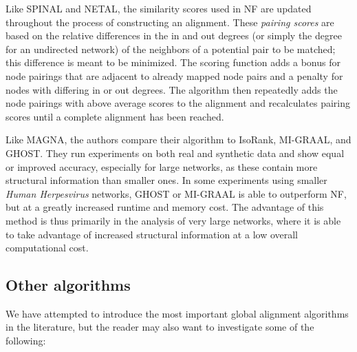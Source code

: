 \documentclass[12pt]{thesis}
\theoremstyle{plain}
\theoremstyle{definition}
\theoremstyle{remark}
\begin{document}
Like SPINAL and NETAL, the similarity scores used in NF are updated throughout the process of constructing an alignment. These \textit{pairing scores} are based on the relative differences in the in and out degrees (or simply the degree for an undirected network) of the neighbors of a potential pair to be matched; this difference is meant to be minimized. The scoring function adds a bonus for node pairings that are adjacent to already mapped node pairs and a penalty for nodes with differing in or out degrees. The algorithm then repeatedly adds the node pairings with above average scores to the alignment and recalculates pairing scores until a complete alignment has been reached.

Like MAGNA, the authors compare their algorithm to IsoRank, MI-GRAAL, and GHOST. They run experiments on both real and synthetic data and show equal or improved accuracy, especially for large networks, as these contain more structural information than smaller ones. In some experiments using smaller \textit{Human Herpesvirus} networks, GHOST or MI-GRAAL is able to outperform NF, but at a greatly increased runtime and memory cost. The advantage of this method is thus primarily in the analysis of very large networks, where it is able to take advantage of increased structural information at a low overall computational cost.

\subsection{Other algorithms}

We have attempted to introduce the most important global alignment algorithms in the literature, but the reader may also want to investigate some of the following:
\end{document}
